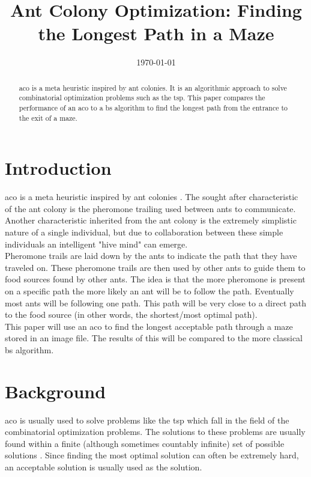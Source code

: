 \documentclass[hidelinks,english,conference]{IEEEtran}
\date{\today}
\begin{document}
\title{Ant Colony Optimization: Finding the Longest Path in a Maze}
\author{
}
\maketitle

\begin{abstract}
\gls{aco} is a meta heuristic inspired by ant colonies. It is an algorithmic approach to solve combinatorial optimization problems such as the \gls{tsp}. This paper compares the performance of an \gls{aco} to a \gls{bs} algorithm to find the longest path from the entrance to the exit of a maze.
\end{abstract}

\IEEEpeerreviewmaketitle

\section{Introduction}
	\gls{aco} is a meta heuristic inspired by ant colonies \cite{colony2002guest}. The sought after characteristic of the ant colony is the pheromone trailing used between ants to communicate. Another characteristic inherited from the ant colony is the extremely simplistic nature of a single individual, but due to collaboration between these simple individuals an intelligent "hive mind" can emerge.\\
    
    Pheromone trails are laid down by the ants to indicate the path that they have traveled on. These pheromone trails are then used by other ants to guide them to food sources found by other ants. The idea is that the more pheromone is present on a specific path the more likely an ant will be to follow the path. Eventually most ants will be following one path. This path will be very close to a direct path to the food source (in other words, the shortest/most optimal path).\\
    
    This paper will use an \gls{aco} to find the longest acceptable path through a maze stored in an image file. The results of this will be compared to the more classical \gls{bs} algorithm.
    
\section{Background}
	\gls{aco} is usually used to solve problems like the \gls{tsp} which fall in the field of the combinatorial optimization problems. The solutions to these problems are usually found within a finite (although sometimes countably infinite) set of possible solutions \cite{papadimitriou1982combinatorial}. Since finding the most optimal solution can often be extremely hard, an acceptable solution is usually used as the solution.\\
    
\end{document}
